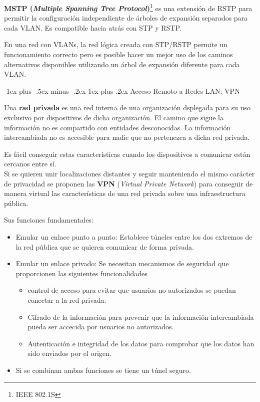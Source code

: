\documentclass[10pt,portrait, twocolumn]{article}
\makeatletter
\renewcommand{\subsubsection}{\@startsection{subsubsection}{3}{0mm}%
                                {-1ex plus -.5ex minus -.2ex}%
                                {1ex plus .2ex}%
                                {\normalfont\small\bfseries}}
\makeatother
\begin{document}
\textbf{MSTP (\textit{Multiple Spanning Tree Protocol})}\footnote{IEEE 802.1S} es una extensión de RSTP para permitir la configuración independiente de árboles de expansión separados para cada VLAN. Es compatible hacia atrás con STP y RSTP.

	\quad En una red con VLANs, la red lógica creada con STP/RSTP permite un funcionamiento correcto pero es posible hacer un mejor uso de los caminos alternativos disponibles utilizando un árbol de expansión diferente para cada VLAN.		

\subsubsection{Acceso Remoto a Redes LAN: VPN}

Una \textbf{rad privada} es una red interna de una organización dsplegada para su uso exclusivo por dispositivos de dicha organización. El camino que sigue la información no es compartido con entidades desconocidas. La información intercambiada no es accesible para nadie que no pertenezca a dicha red privada. 

	\quad Es fácil conseguir estas características cuando los dispositivos a comunicar están cercanos entre sí.\\
	
Si se quieren unir localizaciones distantes y seguir manteniendo el mismo carácter de privacidad se proponen las \textbf{VPN} (\textit{Virtual Private Network}) para conseguir de manera virtual las características de una red privada sobre una infraestructura pública.

\quad Sus funciones fundamentales:

	\begin{itemize}
	\item Emular un enlace punto a punto: Establece túneles entre los dos extremos de la red pública que se quieren comunicar de forma privada.
	\item Emular un enlace privado: Se necesitan mecanismos de seguridad que proporcionen las siguientes funcionalidades
		\begin{itemize}
		\item control de acceso para evitar que usuarios no autorizados se puedan conectar a la red privada.
		\item Cifrado de la información para prevenir que la información intercambiada pueda ser accecida por usuarios no autorizados.
		\item Autenticación e integridad de los datos para comprobar que los datos han sido enviados por el origen.
		\end{itemize}
	\item Si se combinan ambas funciones se tiene un túnel seguro.
	\end{itemize}
	
\end{document}
